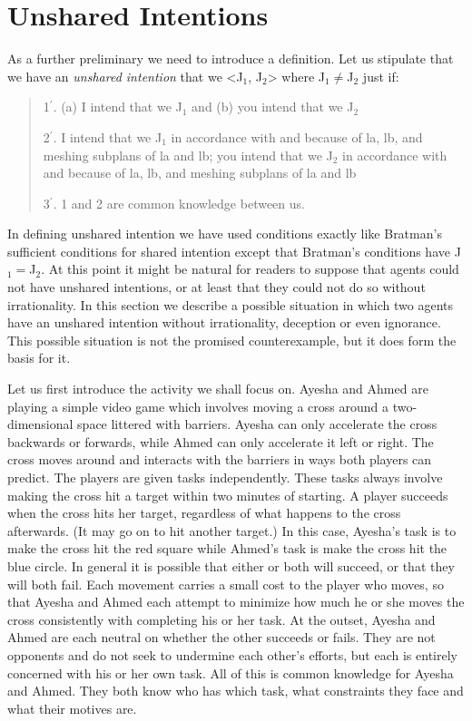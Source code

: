 \documentclass[12pt,\papersize]{extarticle}
\begin{document}
\section{Unshared Intentions}
As a further preliminary we need to introduce a definition.
Let us stipulate that we have an \emph{unshared intention} that we <J$_1$, J$_2$> where J$_1$$\neq$J$_2$ just if:
%
\begin{quote}
\label{df:unshared_intention}
1$^\prime$. (a) I intend that we J$_1$ and (b) you intend that we J$_2$
 
2$^\prime$. I intend that we J$_1$ in accordance with and because of la, lb, and meshing subplans of la and lb; you intend that we J$_2$ in accordance with and because of la, lb, and meshing subplans of la and lb
 
3$^\prime$. 1 and 2 are common knowledge between us.
\end{quote}
In defining unshared intention we have used conditions exactly like Bratman's sufficient conditions for shared intention except that Bratman's conditions have J$_1$$=$J$_2$.
At this point it might be natural for readers to suppose that agents could not have unshared intentions,
or at least that they could not do so without irrationality.
In this section we describe a possible situation in which two agents  have an unshared intention without irrationality, deception or even ignorance.
This possible situation is not the promised counterexample, but it does form the basis for it.

Let us first introduce the activity we shall focus on.
Ayesha and Ahmed  are playing a simple video game which involves moving a cross around a two-dimensional space littered with barriers.
Ayesha can only accelerate the cross backwards or forwards,
while Ahmed can only accelerate it left or right. 
The cross moves around and interacts with the barriers in ways both players can predict.
The players are given tasks independently. 
These tasks always involve making the cross hit a target within two minutes of starting. 
A player succeeds when the cross hits her target, regardless of what happens to the cross afterwards.  
(It may go on to hit another target.)
In this case, 
	Ayesha's task is to make the cross hit the red square
	while
	Ahmed's task is make the cross hit the blue circle. 
In general it is possible that either or both will succeed, or that they will both fail.
Each movement carries a small cost to the player who moves, so that Ayesha and Ahmed each attempt to minimize how much he or she moves the cross consistently with completing his or her task.
At the outset, 
Ayesha and Ahmed are each neutral on whether the other succeeds or fails.
They are not opponents and do not seek to undermine each other's efforts, but each is entirely concerned  with his or her own task.
All of this is common knowledge for Ayesha and Ahmed.
They both know who has which task, what constraints they face and what their motives are.
\end{document}
